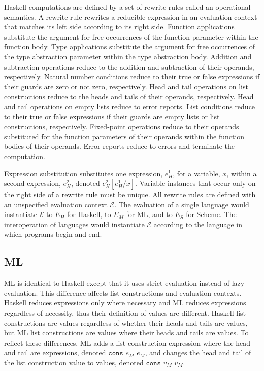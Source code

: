 Haskell computations are defined by a set of rewrite rules called an operational semantics.  A rewrite rule rewrites a reducible expression in an evaluation context that matches its left side according to its right side.  Function applications substitute the argument for free occurrences of the function parameter within the function body.  Type applications substitute the argument for free occurrences of the type abstraction parameter within the type abstraction body.  Addition and subtraction operations reduce to the addition and subtraction of their operands, respectively.  Natural number conditions reduce to their true or false expressions if their guards are zero or not zero, respectively.  Head and tail operations on list constructions reduce to the heads and tails of their operands, respectively.  Head and tail operations on empty lists reduce to error reports.  List conditions reduce to their true or false expressions if their guards are empty lists or list constructions, respectively.  Fixed-point operations reduce to their operands substituted for the function parameters of their operands within the function bodies of their operands.  Error reports reduce to errors and terminate the computation.

Expression substitution substitutes one expression, $e_{H}^{1}$, for a variable, $x$, within a second expression, $e_{H}^{2}$, denoted $e_{H}^{2}[e_{H}^{1}/x]$.  Variable instances that occur only on the right side of a rewrite rule must be unique.  All rewrite rules are defined with an unspecified evaluation context $\mathscr{E}$.  The evaluation of a single language would instantiate $\mathscr{E}$ to $E_{H}$ for Haskell, to $E_{M}$ for ML, and to $E_{S}$ for Scheme.  The interoperation of languages would instantiate $\mathscr{E}$ according to the language in which programs begin and end.

\subsection{ML}

ML is identical to Haskell except that it uses strict evaluation instead of lazy evaluation.  This difference affects list constructions and evaluation contexts.  Haskell reduces expressions only where necessary and ML reduces expressions regardless of necessity, thus their definition of values are different.  Haskell list constructions are values regardless of whether their heads and tails are values, but ML list constructions are values where their heads and tails are values.  To reflect these differences, ML adds a list construction expression where the head and tail are expressions, denoted $\mathtt{cons}$ $e_{M}$ $e_{M}$, and changes the head and tail of the list construction value to values, denoted $\mathtt{cons}$ $v_{M}$ $v_{M}$.

